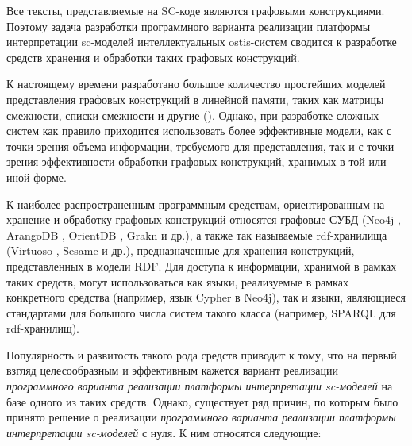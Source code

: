 \begin{SCn}
\begin{scnindent}
\end{scnindent}
\end{SCn}

Все тексты, представляемые на SC-коде являются графовыми конструкциями. Поэтому задача разработки программного варианта
реализации платформы интерпретации sc-моделей интеллектуальных ostis-систем сводится к разработке средств хранения и
обработки таких графовых конструкций.

К настоящему времени разработано большое количество простейших моделей представления графовых конструкций в линейной
памяти, таких как матрицы смежности, списки смежности и другие (). Однако, при разработке сложных
систем как правило приходится использовать более эффективные модели, как с точки зрения объема информации, требуемого
для представления, так и с точки зрения эффективности обработки графовых конструкций, хранимых в той или иной форме.

К наиболее распространенным программным средствам, ориентированным на хранение и обработку графовых конструкций относятся
графовые СУБД (Neo4j , ArangoDB , OrientDB , Grakn  и др.),
а также так называемые rdf-хранилища (Virtuoso , Sesame  и др.), предназначенные для
хранения конструкций, представленных в модели RDF. Для доступа к информации, хранимой в рамках таких средств, могут
использоваться как языки, реализуемые в рамках конкретного средства (например, язык Cypher в Neo4j), так и языки,
являющиеся стандартами для большого числа систем такого класса (например, SPARQL для rdf-хранилищ).

Популярность и развитость такого рода средств приводит к тому, что на первый взгляд целесообразным и эффективным
кажется вариант реализации \textit{программного варианта реализации платформы интерпретации sc-моделей} на базе
одного из таких средств. Однако, существует ряд причин, по которым было принято решение о реализации
\textit{программного варианта реализации платформы интерпретации sc-моделей} с нуля. К ним относятся следующие:

